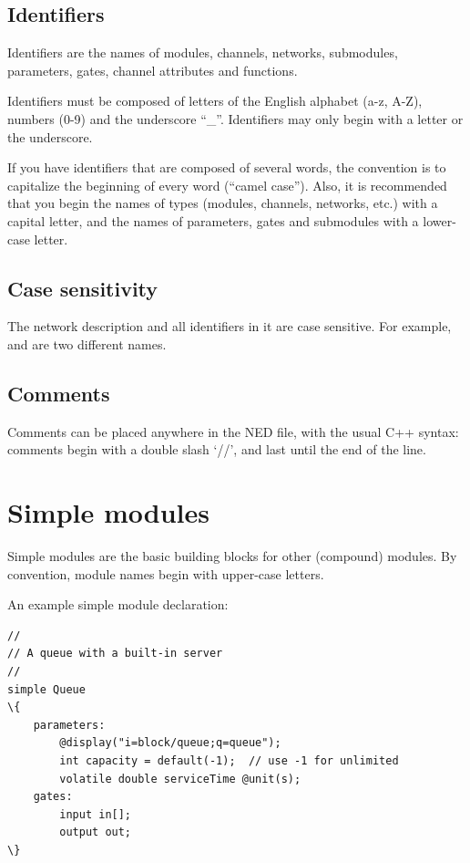 \subsection{Identifiers}

Identifiers are the names of modules, channels, networks,
submodules, parameters, gates, channel attributes and functions.

Identifiers must be composed of letters of the English alphabet (a-z, A-Z),
numbers (0-9) and the underscore ``\_''.
Identifiers may only begin with a letter or the underscore.

If you have identifiers that are composed of several words, the convention
is to capitalize the beginning of every word (``camel case''). Also, it is
recommended that you begin the names of types (modules, channels, networks,
etc.) with a capital letter, and the names of parameters, gates and submodules
with a lower-case letter.


\subsection{Case sensitivity}

The network description and all identifiers in it are case sensitive.
For example,  and  are two different names.


\subsection{Comments}

Comments can be placed anywhere in the NED file, with the usual C++
syntax: comments begin with a double slash `//', and last until
the end of the line.


\section{Simple modules}

Simple modules are the basic building blocks for other (compound)
modules. By convention, module names begin with upper-case letters.

An example simple module declaration:


\begin{Verbatim}[commandchars=\\\{\}]
//
// A queue with a built-in server
//
simple Queue
\{
    parameters:
        @display("i=block/queue;q=queue");
        int capacity = default(-1);  // use -1 for unlimited
        volatile double serviceTime @unit(s);
    gates:
        input in[];
        output out;
\}
\end{Verbatim}

